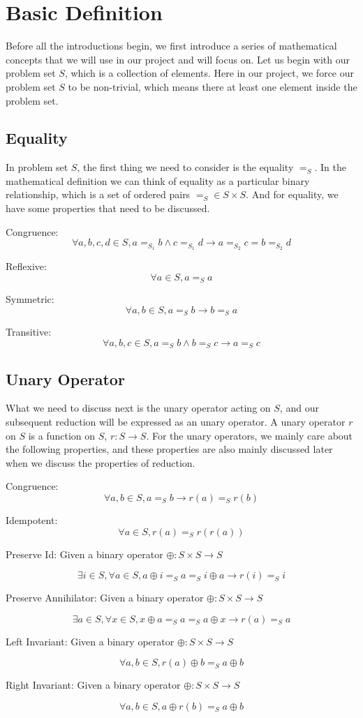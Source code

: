 \documentclass[a4paper,10pt]{article}
\newcommand{\e}[2]{
\begin{equation}
  \label{#1} 
  #2
\end{equation}
}
\begin{document}
\section{Basic Definition}
Before all the introductions begin, we first introduce a series of mathematical concepts that we will use in our project and will focus on. 
Let us begin with our problem set $S$, which is a collection of elements. Here in our project, we force our problem set $S$ to be non-trivial, which means there at least one element inside the problem set.

\subsection{Equality}
In problem set $S$, the first thing we need to consider is the equality $=_S$. 
In the mathematical definition we can think of equality as a particular binary relationship, which is a set of ordered pairs $=_S \in S \times S$. And for equality, we have some properties that need to be discussed. 

Congruence: \e{def:eq:congruence}{\forall a,b,c,d \in S, a =_{S_1} b \wedge c =_{S_1} d \rightarrow a =_{S_2} c = b =_{S_2} d}
Reflexive: \e{def:eq:reflexive}{\forall a \in S, a =_S a}
Symmetric: \e{def:eq:symmetric}{\forall a,b \in S, a =_S b \rightarrow b =_S a}
Transitive: \e{def:eq:transitive}{\forall a,b,c \in S, a =_S b \wedge b=_S c \rightarrow a =_S c}

\subsection{Unary Operator}
What we need to discuss next is the unary operator acting on $S$, and our subsequent reduction will be expressed as an unary operator. A unary operator $r$ on $S$ is a function on $S$, $r : S \rightarrow S$. 
For the unary operators, we mainly care about the following properties, and these properties are also mainly discussed later when we discuss the properties of reduction.

Congruence: \e{def:uop:congruence}{\forall a,b \in S, a =_S b \rightarrow r(a) =_S r(b)}
Idempotent: \e{def:uop:idempotent}{\forall a \in S, r(a) =_S r(r(a))}
Preserve Id: Given a binary operator $\oplus : S \times S \rightarrow S$
\e{def:uop:preserve_id}{\exists i \in S, \forall a \in S, a \oplus i =_S a =_S i \oplus a \rightarrow r(i) =_S i}
Preserve Annihilator: Given a binary operator $\oplus : S \times S \rightarrow S$
\e{def:uop:preserve_ann}{\exists a \in S, \forall x \in S, x \oplus a =_S a =_S a \oplus x \rightarrow r(a) =_S a}
Left Invariant: Given a binary operator $\oplus : S \times S \rightarrow S$
\e{def:uop:left_invariant}{\forall a,b \in S, r(a) \oplus b =_S a \oplus b}
Right Invariant: Given a binary operator $\oplus : S \times S \rightarrow S$
\e{def:uop:right_invariant}{\forall a,b \in S, a \oplus r(b) =_S a \oplus b}
\end{document}
